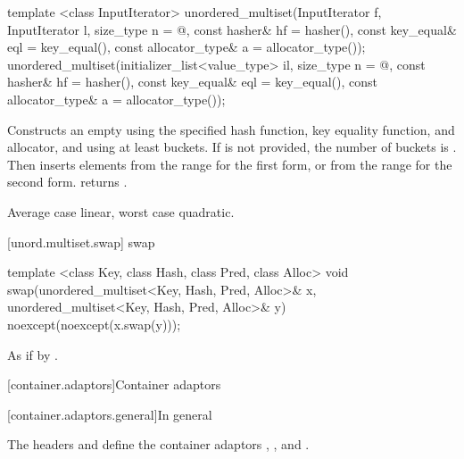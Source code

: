 %
\begin{itemdecl}
template <class InputIterator>
  unordered_multiset(InputIterator f, InputIterator l,
                     size_type n = @\seebelow@,
                     const hasher& hf = hasher(),
                     const key_equal& eql = key_equal(),
                     const allocator_type& a = allocator_type());
unordered_multiset(initializer_list<value_type> il,
                   size_type n = @\seebelow@,
                   const hasher& hf = hasher(),
                   const key_equal& eql = key_equal(),
                   const allocator_type& a = allocator_type());
\end{itemdecl}

\begin{itemdescr}
\pnum\effects
Constructs an empty  using the
specified hash function, key equality function, and allocator, and
using at least  buckets. If  is not
provided, the number of buckets is . Then
inserts elements from the range 
for the first form, or from the range
 for the second form.
 returns .

\pnum\complexity Average case linear, worst case quadratic.
\end{itemdescr}

[unord.multiset.swap]{ swap}

%
\begin{itemdecl}
template <class Key, class Hash, class Pred, class Alloc>
  void swap(unordered_multiset<Key, Hash, Pred, Alloc>& x,
            unordered_multiset<Key, Hash, Pred, Alloc>& y)
    noexcept(noexcept(x.swap(y)));
\end{itemdecl}

\begin{itemdescr}
\pnum\effects As if by .
\end{itemdescr}


[container.adaptors]{Container adaptors}

[container.adaptors.general]{In general}

\pnum
The headers  and  define the container adaptors
, , and .


